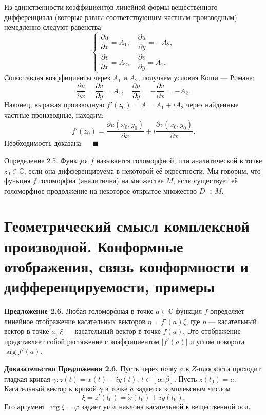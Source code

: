 \documentclass[12pt, a4paper]{article}
\theoremstyle{definition}
\theoremstyle{remark}
\begin{document}
Из единственности коэффициентов линейной формы вещественного дифференциала (которые равны соответствующим частным производным) немедленно следуют равенства:
\[
\begin{cases}
	\dfrac{\partial u}{\partial x} = A_1, \quad \dfrac{\partial u}{\partial y} = -A_2, \\
	\dfrac{\partial v}{\partial x} = A_2, \quad \dfrac{\partial v}{\partial y} = A_1.
\end{cases}
\]
Сопоставляя коэффициенты через $A_1$ и $A_2$, получаем условия Коши — Римана:
\[
\frac{\partial u}{\partial x} = \frac{\partial v}{\partial y} = A_1, \quad \frac{\partial u}{\partial y} = -\frac{\partial v}{\partial x} = -A_2.
\]
Наконец, выражая производную $f'(z_0) = A = A_1 + iA_2$ через найденные частные производные, находим:
\[
f'(z_0) = \frac{\partial u(x_0, y_0)}{\partial x} + i \frac{\partial v(x_0, y_0)}{\partial x}.
\]
Необходимость доказана. $\quad \blacksquare$

Определение 2.5. Функция $f$ называется голоморфной, или аналитической в точке $z_0 \in \mathbb{C}$, если она дифференцируема в некоторой её окрестности. Мы говорим, что функция $f$ голоморфна (аналитична) на множестве $M$, если существует её голоморфное продолжение на некоторое открытое множество $D \supset M$.

\newpage
\section{Геометрический смысл комплексной производной. Конформные отображения, связь конформности и дифференцируемости, примеры}
\textbf{Предложение 2.6.} Любая голоморфная в точке $a \in \mathbb{C}$ функция $f$ определяет линейное отображение касательных векторов $\eta = f'(a)\xi$, где $\eta$ --- касательный вектор в точке $a$, $\xi$ --- касательный вектор в точке $f(a)$. Это отображение представляет собой растяжение с коэффициентом $|f'(a)|$ и углом поворота $\arg f'(a)$.

\textbf{Доказательство Предложения 2.6.} 
Пусть через точку $a$ в $Z$-плоскости проходит гладкая кривая $\gamma: z(t) = x(t) + iy(t)$, $t \in [\alpha, \beta]$. Пусть $z(t_0) = a$. Касательный вектор к кривой $\gamma$ в точке $a$ задается комплексным числом 
\[
\xi = z'(t_0) = \dot{x}(t_0) + i\dot{y}(t_0).
\]
Его аргумент $\arg\xi = \varphi$ задает угол наклона касательной к вещественной оси.
\end{document}
